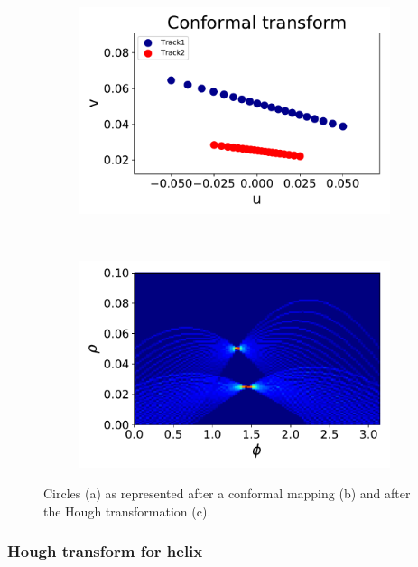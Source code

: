 \documentclass{cernatsnote}
\begin{document}
\begin{figure}[ht]
\begin{subfigure}[b]{0.3\textwidth}
    \end{subfigure}
		~ %
		\begin{subfigure}[b]{0.3\textwidth}
					\includegraphics[width=\textwidth]{figures/circle_CT.pdf}
					\caption{}
			\end{subfigure}
			~ %
			\begin{subfigure}[b]{0.3\textwidth}
						\includegraphics[width=\textwidth]{figures/circle_HT.pdf}
						\caption{}
				\end{subfigure}
	\label{HTcircle}
	\caption{Circles (a) as represented after a conformal mapping (b) and after the Hough transformation (c).}
\end{figure}



\subsubsection{Hough transform for helix}
\end{document}
